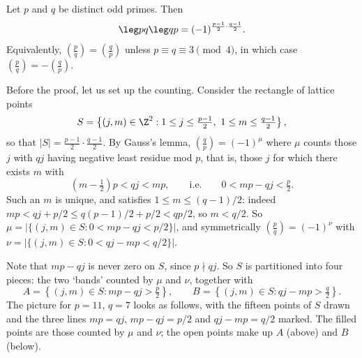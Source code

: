 \begin{theorem}\label{thm:qr}
	Let $p$ and $q$ be distinct odd primes. Then
	$$
	\leg pq \leg qp = (-1)^{\frac{p-1}2 \cdot \frac{q-1}2}.
	$$
	Equivalently, $\left( \frac pq \right) = \left( \frac qp \right)$ unless $p \equiv q \equiv 3 \pmod 4$, in which case $\left( \frac pq \right) = -\left( \frac qp \right)$.
\end{theorem}

Before the proof, let us set up the counting. Consider the rectangle of lattice points
$$
S = \left\{ (j, m) \in \Z^2 : 1 \leq j \leq \tfrac{p-1}2, \ 1 \leq m \leq \tfrac{q-1}{2} \right\},
$$
so that $|S| = \frac{p-1}2 \cdot \frac{q-1}2$. By Gauss's lemma, $\left( \frac qp \right) = (-1)^\mu$ where $\mu$ counts those $j$ with $qj$ having negative least residue mod $p$, that is, those $j$ for which there exists $m$ with
$$
\left(m - \tfrac12\right)p < qj < mp, \qquad \text{i.e.} \qquad 0 < mp - qj < \tfrac p2.
$$
Such an $m$ is unique, and satisfies $1 \leq m \leq (q-1)/2$: indeed $mp < qj + p/2 \leq q(p-1)/2 + p/2 < qp/2$, so $m < q/2$. So $\mu = |\{(j,m) \in S : 0 < mp - qj < p/2\}|$, and symmetrically $\left( \frac pq \right) = (-1)^\nu$ with $\nu = |\{(j,m) \in S : 0 < qj - mp < q/2\}|$.

Note that $mp - qj$ is never zero on $S$, since $p \nmid qj$. So $S$ is partitioned into four pieces: the two `bands' counted by $\mu$ and $\nu$, together with
$$
A = \left\{ (j,m) \in S : mp - qj > \tfrac p2 \right\}, \qquad B = \left\{ (j,m) \in S : qj - mp > \tfrac q2 \right\}.
$$
The picture for $p = 11$, $q = 7$ looks as follows, with the fifteen points of $S$ drawn and the three lines $mp = qj$, $mp - qj = p/2$ and $qj - mp = q/2$ marked. The filled points are those counted by $\mu$ and $\nu$; the open points make up $A$ (above) and $B$ (below).

\begin{center}
\end{center}

